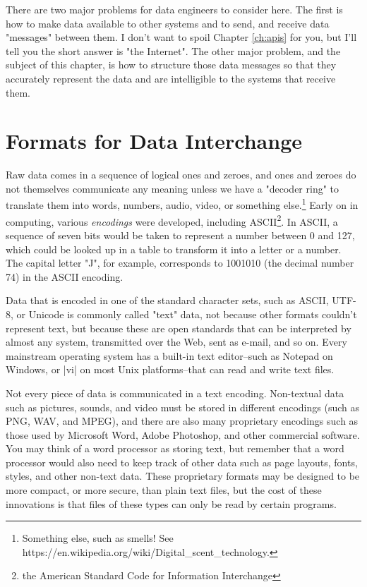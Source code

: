\documentclass[11pt]{book}
\newcommand{\term}[1]{\emph{#1}} %
\begin{document}
There are two major problems for data engineers to consider here.  The first is how to make data available to other systems and to send, and receive data "messages" between them.  I don't want to spoil Chapter \ref{ch:apis} for you, but I'll tell you the short answer is "the Internet".  The other major problem, and the subject of this chapter, is how to structure those data messages so that they accurately represent the data  and are intelligible to the systems that receive them.

\section{Formats for Data Interchange}
Raw data comes in a sequence of logical ones and zeroes, and ones and zeroes do not themselves communicate any meaning unless we have a "decoder ring" to translate them into words, numbers, audio, video, or something else.\footnote{Something else, such as smells!  See https://en.wikipedia.org/wiki/Digital\_scent\_technology.}  Early on in computing, various \term{encodings} were developed, including ASCII\footnote{the American Standard Code for Information Interchange}.  In ASCII, a sequence of seven bits would be taken to represent a number between 0 and 127, which could be looked up in a table to transform it into a letter or a number.  The capital letter "J", for example, corresponds to 1001010 (the decimal number 74) in the ASCII encoding.

Data that is encoded in one of the standard character sets, such as ASCII, UTF-8, or Unicode is commonly called "text" data, not because other formats couldn't represent text, but because these are open standards that can be interpreted by almost any system, transmitted over the Web, sent as e-mail, and so on.  Every mainstream operating system has a built-in text editor--such as Notepad on Windows, or |vi| on most Unix platforms--that can read and write text files.

Not every piece of data is communicated in a text encoding.  Non-textual data such as pictures, sounds, and video must be stored in different encodings (such as PNG, WAV, and MPEG), and there are also many proprietary encodings such as those used by Microsoft Word, Adobe Photoshop, and other commercial software.  You may think of a word processor as storing text, but remember that a word processor would also need to keep track of other data such as page layouts, fonts, styles, and other non-text data.  These proprietary formats may be designed to be more compact, or more secure, than plain text files, but the cost of these innovations is that files of these types can only be read by certain programs.
\end{document}
